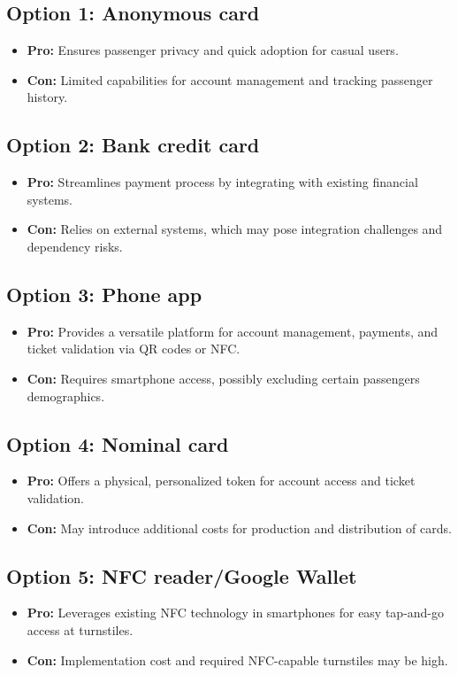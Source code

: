 \subsection*{Option 1: Anonymous card}
\begin{itemize}
    \item \textbf{Pro:} Ensures passenger privacy and quick adoption for casual users.
    \item \textbf{Con:} Limited capabilities for account management and tracking passenger history.
\end{itemize}

\subsection*{Option 2: Bank credit card}
\begin{itemize}
    \item \textbf{Pro:} Streamlines payment process by integrating with existing financial systems.
    \item \textbf{Con:} Relies on external systems, which may pose integration challenges and dependency risks.
\end{itemize}

\subsection*{Option 3: Phone app}
\begin{itemize}
    \item \textbf{Pro:} Provides a versatile platform for account management, payments, and ticket validation via QR codes or NFC.
    \item \textbf{Con:} Requires smartphone access, possibly excluding certain passengers demographics.
\end{itemize}

\subsection*{Option 4: Nominal card}
\begin{itemize}
    \item \textbf{Pro:} Offers a physical, personalized token for account access and ticket validation.
    \item \textbf{Con:} May introduce additional costs for production and distribution of cards.
\end{itemize}

\subsection*{Option 5: NFC reader/Google Wallet}
\begin{itemize}
    \item \textbf{Pro:} Leverages existing NFC technology in smartphones for easy tap-and-go access at turnstiles.
    \item \textbf{Con:} Implementation cost and required NFC-capable turnstiles may be high.
\end{itemize}

